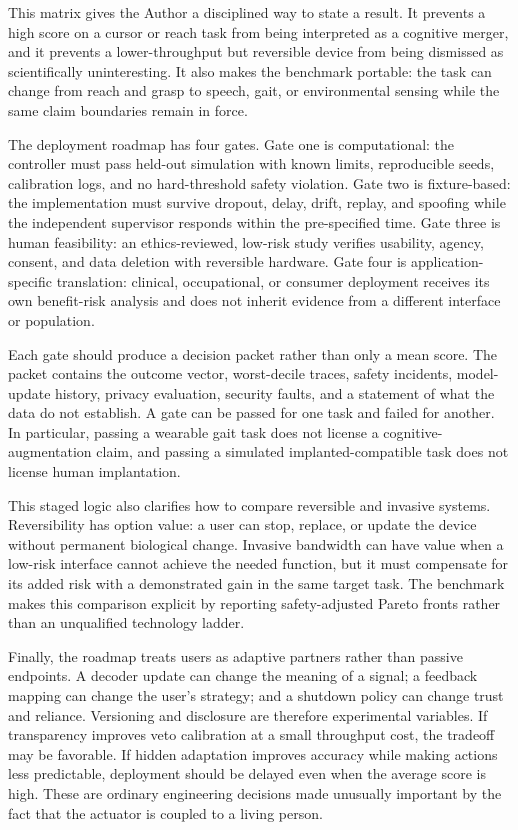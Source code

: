 \documentclass[conference]{IEEEtran}
\begin{document}
This matrix gives the Author a disciplined way to state a result. It prevents a high score on a cursor or reach task from being interpreted as a cognitive merger, and it prevents a lower-throughput but reversible device from being dismissed as scientifically uninteresting. It also makes the benchmark portable: the task can change from reach and grasp to speech, gait, or environmental sensing while the same claim boundaries remain in force.

The deployment roadmap has four gates. Gate one is computational: the controller must pass held-out simulation with known limits, reproducible seeds, calibration logs, and no hard-threshold safety violation. Gate two is fixture-based: the implementation must survive dropout, delay, drift, replay, and spoofing while the independent supervisor responds within the pre-specified time. Gate three is human feasibility: an ethics-reviewed, low-risk study verifies usability, agency, consent, and data deletion with reversible hardware. Gate four is application-specific translation: clinical, occupational, or consumer deployment receives its own benefit-risk analysis and does not inherit evidence from a different interface or population.

Each gate should produce a decision packet rather than only a mean score. The packet contains the outcome vector, worst-decile traces, safety incidents, model-update history, privacy evaluation, security faults, and a statement of what the data do not establish. A gate can be passed for one task and failed for another. In particular, passing a wearable gait task does not license a cognitive-augmentation claim, and passing a simulated implanted-compatible task does not license human implantation.

This staged logic also clarifies how to compare reversible and invasive systems. Reversibility has option value: a user can stop, replace, or update the device without permanent biological change. Invasive bandwidth can have value when a low-risk interface cannot achieve the needed function, but it must compensate for its added risk with a demonstrated gain in the same target task. The benchmark makes this comparison explicit by reporting safety-adjusted Pareto fronts rather than an unqualified technology ladder.

Finally, the roadmap treats users as adaptive partners rather than passive endpoints. A decoder update can change the meaning of a signal; a feedback mapping can change the user's strategy; and a shutdown policy can change trust and reliance. Versioning and disclosure are therefore experimental variables. If transparency improves veto calibration at a small throughput cost, the tradeoff may be favorable. If hidden adaptation improves accuracy while making actions less predictable, deployment should be delayed even when the average score is high. These are ordinary engineering decisions made unusually important by the fact that the actuator is coupled to a living person.
\end{document}
